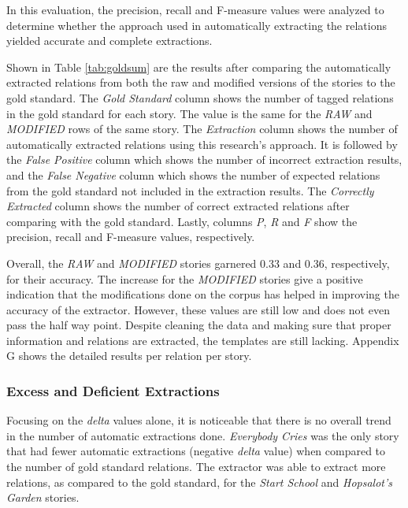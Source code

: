 In this evaluation, the precision, recall and F-measure values were analyzed to determine whether the approach used in automatically extracting the  relations yielded accurate and complete extractions.

Shown in Table \ref{tab:goldsum} are the results after comparing the automatically extracted relations from both the raw and modified versions of the stories to the gold standard. The \textit{Gold Standard} column shows the number of tagged relations in the gold standard for each story. The value is the same for the \textit{RAW} and \textit{MODIFIED} rows of the same story. The \textit{Extraction} column shows the number of automatically extracted relations using this research's approach. It is followed by the \textit{False Positive} column which shows the number of incorrect extraction results, and the \textit{False Negative} column which shows the number of expected relations from the gold standard not included in the extraction results. The \textit{Correctly Extracted} column shows the number of correct extracted relations after comparing with the gold standard. Lastly, columns \textit{P}, \textit{R} and \textit{F} show the precision, recall and F-measure values, respectively.

Overall, the \textit{RAW} and \textit{MODIFIED} stories garnered 0.33 and 0.36, respectively, for their accuracy. The increase for the \textit{MODIFIED} stories give a positive indication that the modifications done on the corpus has helped in improving the accuracy of the extractor. However, these values are still low and does not even pass the half way point. Despite cleaning the data and making sure that proper information and relations are extracted, the templates are still lacking. Appendix G shows the detailed results per relation per story.

\subsubsection*{Excess and Deficient Extractions}

Focusing on the \textit{delta} values alone, it is noticeable that there is no overall trend in the number of automatic extractions done. \textit{Everybody Cries} was the only story that had fewer automatic extractions (negative \textit{delta} value) when compared to the number of gold standard relations. The extractor was able to extract more relations, as compared to the gold standard, for the \textit{Start School} and \textit{Hopsalot's Garden} stories.  

